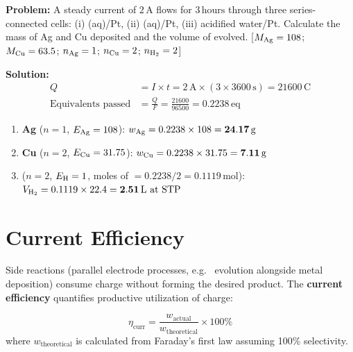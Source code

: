 \begin{examplebox}
\textbf{Problem:} A steady current of $2\,\text{A}$ flows for $3\,\text{hours}$ through three series-connected cells: (i) (aq)/Pt, (ii) (aq)/Pt, (iii) acidified water/Pt. Calculate the mass of Ag and Cu deposited and the volume of  evolved. [$M_{\ce{Ag}}=108$; $M_{\ce{Cu}}=63.5$; $n_{\ce{Ag}}=1$; $n_{\ce{Cu}}=2$; $n_{\ce{H2}}=2$]

\textbf{Solution:}
\begin{align*}
Q &= I \times t = 2\,\text{A} \times (3 \times 3600\,\text{s}) = 21600\,\text{C}\\[4pt]
\text{Equivalents passed} &= \frac{Q}{F} = \frac{21600}{96500} = 0.2238\,\text{eq}
\end{align*}
\begin{enumerate}
    \item \textbf{Ag} ($n=1$, $E_{\ce{Ag}}=108$):
    $w_{\ce{Ag}} = 0.2238 \times 108 = \mathbf{24.17\,\text{g}}$
    \item \textbf{Cu} ($n=2$, $E_{\ce{Cu}}=31.75$):
    $w_{\ce{Cu}} = 0.2238 \times 31.75 = \mathbf{7.11\,\text{g}}$
    \item \textbf{} ($n=2$, $E_{\ce{H}}=1$, moles of  $= 0.2238/2 = 0.1119\,\text{mol}$):
    $V_{\ce{H2}} = 0.1119 \times 22.4 = \mathbf{2.51\,\text{L at STP}}$
\end{enumerate}
\end{examplebox}

\section{Current Efficiency}

Side reactions (parallel electrode processes, e.g.\  evolution alongside metal deposition) consume charge without forming the desired product. The \textbf{current efficiency} quantifies productive utilization of charge:

\begin{conceptbox}
\begin{equation}
    \boxed{\eta_{\text{curr}} = \frac{w_{\text{actual}}}{w_{\text{theoretical}}} \times 100\%}
\end{equation}
where $w_{\text{theoretical}}$ is calculated from Faraday's first law assuming 100\% selectivity.
\end{conceptbox}

